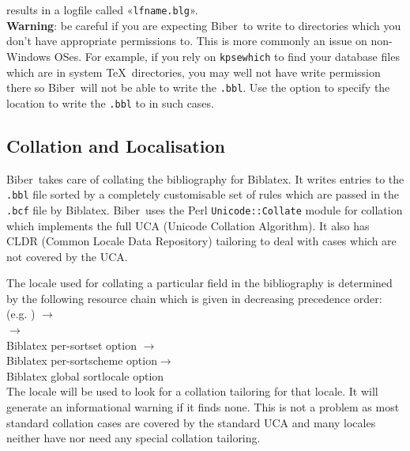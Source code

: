 \documentclass{ltxdockit}
\newcommand*{\biber}{Biber\xspace}
\newcommand*{\biblatex}{Biblatex\xspace}
\begin{document}
\noindent results in a logfile called «\verb+lfname.blg+».\\

\noindent \textbf{Warning}: be careful if you are expecting \biber\ to
write to directories which you don't have appropriate permissions to. This
is more commonly an issue on non-Windows OSes. For example, if you rely on
\verb+kpsewhich+ to find your database files which are in system \TeX\
directories, you may well not have write permission there so \biber\
will not be able to write the \verb+.bbl+. Use the 
option to specify the location to write the \verb+.bbl+ to in such cases.

\subsection{Collation and Localisation}\label{coll}

\biber\ takes care of collating the bibliography for
\biblatex. It writes entries to the \verb+.bbl+ file sorted by a
completely customisable set of rules which are passed in the
\verb+.bcf+ file by \biblatex. \biber\ uses the Perl
\verb+Unicode::Collate+ module for collation which implements the full UCA
(Unicode Collation Algorithm). It also has CLDR (Common Locale Data
Repository) tailoring to deal with cases which are not covered by the
UCA.

The locale used for collating a particular field in the bibliography is
determined by the following resource chain which is given
in decreasing precedence order:\\[2ex]

\noindent{} (e.g. ) $\rightarrow$\\
\hspace*{1em} $\rightarrow$\\
\hspace*{2em}\biblatex per-sortset  option $\rightarrow$\\
\hspace*{3em}\biblatex per-sortscheme \opt{locale} option$\rightarrow$\\
\hspace*{4em}\biblatex global sortlocale option\\

\noindent The locale will be used to look for a collation tailoring for
that locale. It will generate an informational warning if it finds none.
This is not a problem as most standard collation cases are covered by the
standard UCA and many locales neither have nor need any special collation
tailoring.
\end{document}
